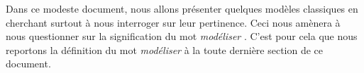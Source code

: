 Dans ce modeste document, nous allons présenter quelques modèles classiques en cherchant surtout à nous interroger sur leur pertinence. Ceci nous amènera à nous questionner sur la signification du mot \emph{\og modéliser \fg{}}. C'est pour cela que nous reportons la définition du mot \emph{\og modéliser \fg{}} à la toute dernière section de ce document.
